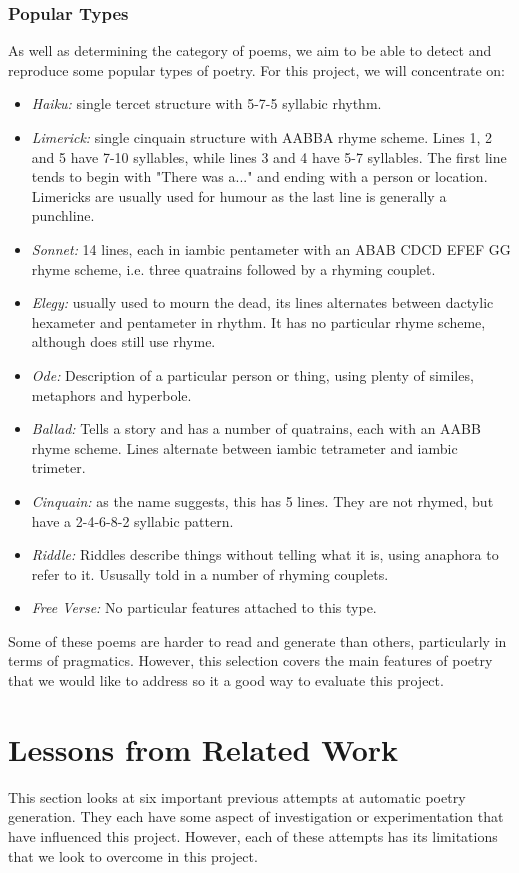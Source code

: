 \subsubsection{Popular Types}
As well as determining the category of poems, we aim to be able to detect and reproduce some popular types of poetry. For this project, we will concentrate on:
\begin{itemize}
\item{\textit{Haiku:} single tercet structure with 5-7-5 syllabic rhythm.}
\item{\textit{Limerick:} single cinquain structure with AABBA rhyme scheme. Lines 1, 2 and 5 have 7-10 syllables, while lines 3 and 4 have 5-7 syllables. The first line tends to begin with "There was a..." and ending with a person or location. Limericks are usually used for humour as the last line is generally a punchline.}
\item{\textit{Sonnet:} 14 lines, each in iambic pentameter with an ABAB CDCD EFEF GG rhyme scheme, i.e. three quatrains followed by a rhyming couplet.}
\item{\textit{Elegy:} usually used to mourn the dead, its lines alternates between dactylic hexameter and pentameter in rhythm. It has no particular rhyme scheme, although does still use rhyme. }
\item{\textit{Ode:} Description of a particular person or thing, using plenty of similes, metaphors and hyperbole.}
\item{\textit{Ballad:} Tells a story and has a number of quatrains, each with an AABB rhyme scheme. Lines alternate between iambic tetrameter and iambic trimeter.}
\item{\textit{Cinquain:} as the name suggests, this has 5 lines. They are not rhymed, but have a 2-4-6-8-2 syllabic pattern. }
\item{\textit{Riddle:} Riddles describe things without telling what it is, using anaphora to refer to it. Ususally told in a number of rhyming couplets.}
\item{\textit{Free Verse:} No particular features attached to this type.}
\end{itemize} 

Some of these poems are harder to read and generate than others, particularly in terms of pragmatics. However, this selection covers the main features of poetry that we would like to address so it a good way to evaluate this project.


\section{Lessons from Related Work}
\label{sec:related_work}
This section looks at six important previous attempts at automatic poetry generation. They each have some aspect of investigation or experimentation that have influenced this project. However, each of these attempts has its limitations that we look to overcome in this project.

